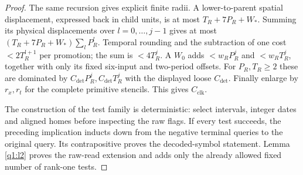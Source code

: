 \begin{proof}
The same recursion gives explicit finite radii. A lower-to-parent spatial displacement, expressed back in child units, is at most \(T_{R}+7P_{R}+W_{*}\). Summing its physical displacements over \(l=0,\dots,j-1\) gives at most \((T_{R}+7P_{R}+W_{*}) \sum _{l} P_{R}^{l}\). Temporal rounding and the subtraction of one cost \(<2T_{R}^{l+1}\) per promotion; the sum is \(<4T_{R}^{j}\). A \(W_0\) adds \(<w_{R} P_{R}^{j}\) and \(<w_{R} T_{R}^{j}\), together with only its fixed six-input and two-period offsets. For \(P_{R},T_{R}\ge 2\) these are dominated by \(C_{\mathrm{det}} P_{R}^{j},C_{\mathrm{det}} T_{R}^{j}\) with the displayed loose \(C_{\mathrm{det}}\). Finally enlarge by \(r_{x},r_{t}\) for the complete primitive stencils. This gives \(C_{\mathrm{clk}}\).

The construction of the test family is deterministic: select intervals, integer dates and aligned homes before inspecting the raw flags. If every test succeeds, the preceding implication inducts down from the negative terminal queries to the original query. Its contrapositive proves the decoded-symbol statement. Lemma \ref{q1:l2} proves the raw-read extension and adds only the already allowed fixed number of rank-one tests. 
\end{proof}

